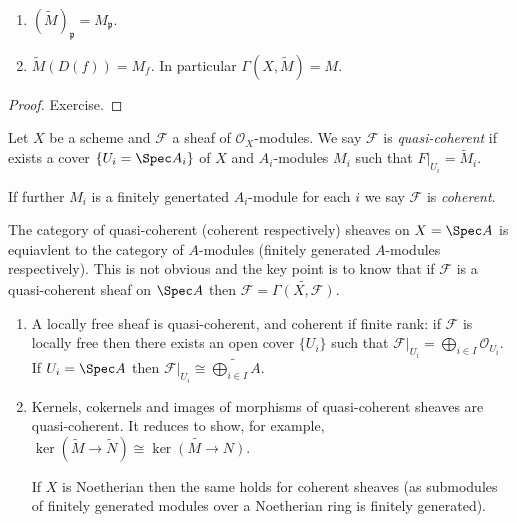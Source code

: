 \documentclass[a4paper]{article}
\newcommand{\sh}[1]{\mathcal{#1}} %
\begin{document}
\begin{proposition}\leavevmode
  \begin{enumerate}
  \item \((\widetilde M)_{\mathfrak p} = M_{\mathfrak p}\).
  \item \(\widetilde M(D(f)) = M_f\). In particular \(\Gamma(X, \widetilde M) = M\).
  \end{enumerate}
\end{proposition}

\begin{proof}
  Exercise.
\end{proof}

\begin{definition}
  Let \(X\) be a scheme and \(\sh F\) a sheaf of \(\sh O_X\)-modules. We say \(\sh F\) is \emph{quasi-coherent} if exists a cover \(\{U_i = \Spec A_i\}\) of \(X\) and \(A_i\)-modules \(M_i\) such that \(F|_{U_i} = \widetilde M_i\).

  If further \(M_i\) is a finitely genertated \(A_i\)-module for each \(i\) we say \(\sh F\) is \emph{coherent}.
\end{definition}

\begin{remark}
  The category of quasi-coherent (coherent respectively) sheaves on \(X = \Spec A\) is equiavlent to the category of \(A\)-modules (finitely generated \(A\)-modules respectively). This is not obvious and the key point is to know that if \(\sh F\) is a quasi-coherent sheaf on \(\Spec A\) then \(\sh F = \widetilde{\Gamma(X, \sh F)}\).
\end{remark}

\begin{eg}\leavevmode
  \begin{enumerate}
  \item A locally free sheaf is quasi-coherent, and coherent if finite rank: if \(\sh F\) is locally free then there exists an open cover \(\{U_i\}\) such that \(\sh F|_{U_i} = \bigoplus_{i \in I} \sh O_{U_i}\). If \(U_i = \Spec A\) then \(\sh F|_{U_i} \cong \widetilde{\bigoplus_{i \in I} A}\).
  \item Kernels, cokernels and images of morphisms of quasi-coherent sheaves are quasi-coherent. It reduces to show, for example, \(\ker(\widetilde M \to \widetilde N) \cong \widetilde{\ker(M \to N)}\).

    If \(X\) is Noetherian then the same holds for coherent sheaves (as submodules of finitely generated modules over a Noetherian ring is finitely generated).
  \end{enumerate}
\end{eg}
\end{document}
